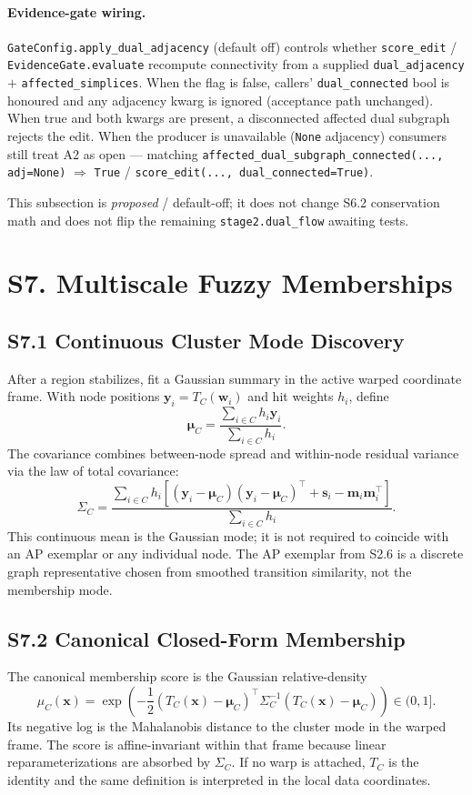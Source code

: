 \documentclass[11pt]{article}
\begin{document}
\paragraph{Evidence-gate wiring.}
\texttt{GateConfig.apply\_dual\_adjacency} (default off) controls whether
\texttt{score\_edit} / \texttt{EvidenceGate.evaluate} recompute connectivity
from a supplied \texttt{dual\_adjacency} $+$ \texttt{affected\_simplices}.
When the flag is false, callers' \texttt{dual\_connected} bool is honoured and
any adjacency kwarg is ignored (acceptance path unchanged). When true and both
kwargs are present, a disconnected affected dual subgraph rejects the edit.
When the producer is unavailable (\texttt{None} adjacency) consumers still
treat A2 as open --- matching
\texttt{affected\_dual\_subgraph\_connected(..., adj=None)} $\Rightarrow$
\texttt{True} / \texttt{score\_edit(..., dual\_connected=True)}.

This subsection is \emph{proposed} / default-off; it does not change S6.2
conservation math and does not flip the remaining
\texttt{stage2.dual\_flow} awaiting tests.

\section*{S7. Multiscale Fuzzy Memberships}
\label{sec:si-memberships}

\subsection*{S7.1 Continuous Cluster Mode Discovery}
After a region stabilizes, fit a Gaussian summary in the active warped coordinate frame. With node positions $\mathbf y_i=T_C(\mathbf w_i)$ and hit weights $h_i$, define
\[
\boldsymbol\mu_C=\frac{\sum_{i\in C}h_i\mathbf y_i}{\sum_{i\in C}h_i}.
\label{eq:si-cluster-mode}
\]
The covariance combines between-node spread and within-node residual variance via the law of total covariance:
\[
\Sigma_C
=
\frac{
\sum_{i\in C}h_i
\left[
(\mathbf y_i-\boldsymbol\mu_C)(\mathbf y_i-\boldsymbol\mu_C)^\top
+\mathbf s_i-\mathbf m_i\mathbf m_i^\top
\right]
}{
\sum_{i\in C}h_i
}.
\label{eq:si-cluster-covariance}
\]
This continuous mean is the Gaussian mode; it is not required to coincide with an AP exemplar or any individual node. The AP exemplar from S2.6 is a discrete graph representative chosen from smoothed transition similarity, not the membership mode.

\subsection*{S7.2 Canonical Closed-Form Membership}
\label{sec:si-gaussian-membership}
The canonical membership score is the Gaussian relative-density
\[
\mu_C(\mathbf x)=
\exp\!\left(
-\frac12
(T_C(\mathbf x)-\boldsymbol\mu_C)^\top
\Sigma_C^{-1}
(T_C(\mathbf x)-\boldsymbol\mu_C)
\right)\in(0,1].
\label{eq:si-gaussian-membership}
\]
Its negative log is the Mahalanobis distance to the cluster mode in the warped frame. The score is affine-invariant within that frame because linear reparameterizations are absorbed by $\Sigma_C$. If no warp is attached, $T_C$ is the identity and the same definition is interpreted in the local data coordinates.
\end{document}
